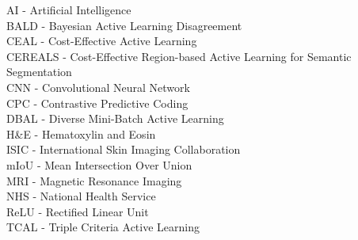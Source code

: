 AI - Artificial Intelligence\\
BALD - Bayesian Active Learning Disagreement\\
CEAL - Cost-Effective Active Learning\\
CEREALS - Cost-Effective Region-based Active Learning for Semantic Segmentation\\
CNN - Convolutional Neural Network\\
CPC - Contrastive Predictive Coding\\
DBAL - Diverse Mini-Batch Active Learning\\
H\&E - Hematoxylin and Eosin\\
ISIC - International Skin Imaging Collaboration\\
mIoU - Mean Intersection Over Union\\
MRI - Magnetic Resonance Imaging\\
NHS - National Health Service\\
ReLU - Rectified Linear Unit\\
TCAL - Triple Criteria Active Learning\\